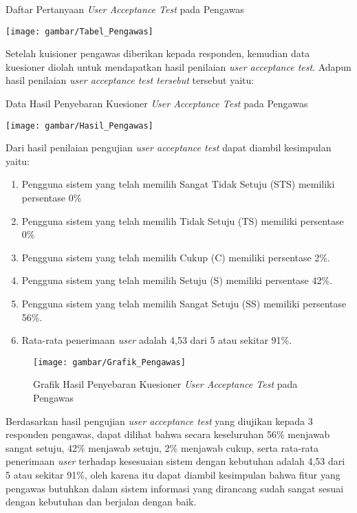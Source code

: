 \begin{table}[H]
	\centering
	\caption{Daftar Pertanyaan \textit{User Acceptance Test} pada Pengawas}
	\texttt{[image: gambar/Tabel\_Pengawas]}
\end{table}

Setelah kuisioner pengawas diberikan kepada responden, kemudian data kuesioner diolah untuk mendapatkan hasil penilaian \textit{user acceptance test}. Adapun hasil penilaian \textit{user acceptance test tersebut} tersebut yaitu:

\begin{table}[H]
	\centering
	\caption{Data Hasil Penyebaran Kuesioner \textit{User Acceptance Test} pada Pengawas}
	\texttt{[image: gambar/Hasil\_Pengawas]}
\end{table}

Dari hasil penilaian pengujian \textit{user acceptance test} dapat diambil kesimpulan yaitu:

\begin{enumerate}
	\item Pengguna sistem yang telah memilih Sangat Tidak Setuju (STS) memiliki persentase 0\%
	\item Pengguna sistem yang telah memilih Tidak Setuju (TS) memiliki persentase 0\%
	\item Pengguna sistem yang telah memilih Cukup (C) memiliki persentase 2\%.
	\item Pengguna sistem yang telah memilih Setuju (S) memiliki persentase 42\%.
	\item Pengguna sistem yang telah memilih Sangat Setuju (SS) memiliki persentase 56\%.
	\item Rata-rata penerimaan \textit{user} adalah 4,53 dari 5 atau sekitar 91\%.
\end{enumerate}

\begin{figure}[H]
	\centering
	\texttt{[image: gambar/Grafik\_Pengawas]}
	\caption{Grafik Hasil Penyebaran Kuesioner \textit{User Acceptance Test} pada Pengawas}
\end{figure}

Berdasarkan hasil pengujian \textit{user acceptance test} yang diujikan kepada 3 responden pengawas, dapat dilihat bahwa secara keseluruhan 56\% menjawab sangat setuju, 42\% menjawab setuju, 2\% menjawab cukup, serta rata-rata penerimaan \textit{user} terhadap kesesuaian sistem dengan kebutuhan adalah 4,53 dari 5 atau sekitar 91\%, oleh karena itu dapat diambil kesimpulan bahwa fitur yang pengawas butuhkan dalam sistem informasi yang dirancang sudah sangat sesuai dengan kebutuhan dan berjalan dengan baik. 

\begin{comment}

\end{comment}
